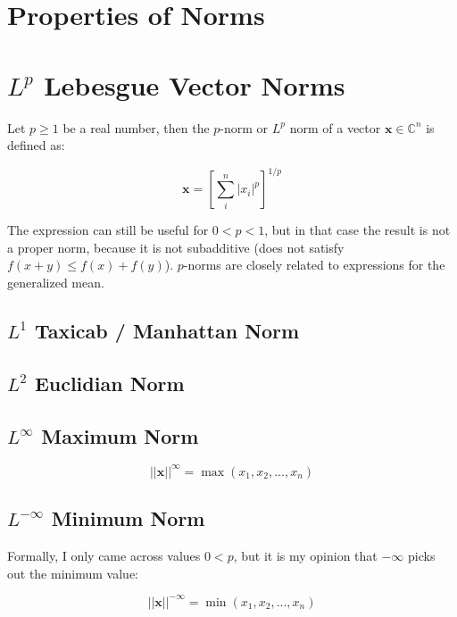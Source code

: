 \section{Properties of Norms}

\section{$L^p$ Lebesgue Vector Norms}
\label{lpnorms}

Let $p\geq1$ be a real number, then the $p$-norm or $L^p$ norm of a vector $\mathbf{x}\in\mathbb{C}^n$ is defined as:

\begin{equation}
\mathbf{x} = \left[ \sum^n_i |x_i|^p \right]^{1/p}
\end{equation}

The expression can still be useful for $0<p<1$, but in that case the result is not a proper norm, because it is not subadditive (does not satisfy $f(x+y) \leq f(x) + f(y)$). $p$-norms are closely related to expressions for the generalized mean.

\subsection{$L^{1}$ Taxicab / Manhattan Norm}

\subsection{$L^{2}$ Euclidian Norm}

\subsection{$L^{\infty}$ Maximum Norm} 

\begin{equation}
||\mathbf{x}||^{\infty} = \max(x_1,x_2,...,x_n)
\end{equation}

\subsection{$L^{-\infty}$ Minimum Norm} 

Formally, I only came across values $0<p$, but it is my opinion that $-\infty$ picks out the minimum value:

\begin{equation}
||\mathbf{x}||^{-\infty} = \min(x_1,x_2,...,x_n)
\end{equation}



